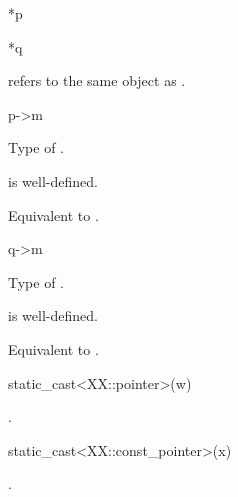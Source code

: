 \begin{itemdecl}
*p
\end{itemdecl}

\begin{itemdescr}
\pnum
\result
{}
\end{itemdescr}

\begin{itemdecl}
*q
\end{itemdecl}

\begin{itemdescr}
\pnum
\result
{}

\pnum
\ensures
{} refers to the same object as .
\end{itemdescr}

\begin{itemdecl}
p->m
\end{itemdecl}

\begin{itemdescr}
\pnum
\result
Type of .

\pnum
\expects
{} is well-defined.

\pnum
\effects
Equivalent to .
\end{itemdescr}

\begin{itemdecl}
q->m
\end{itemdecl}

\begin{itemdescr}
\pnum
\result
Type of .

\pnum
\expects
{} is well-defined.

\pnum
\effects
Equivalent to .
\end{itemdescr}

\begin{itemdecl}
static_cast<XX::pointer>(w)
\end{itemdecl}

\begin{itemdescr}
\pnum
\result
{}

\pnum
\ensures
{}.
\end{itemdescr}

\begin{itemdecl}
static_cast<XX::const_pointer>(x)
\end{itemdecl}

\begin{itemdescr}
\pnum
\result
{}

\pnum
\ensures
{}.
\end{itemdescr}

